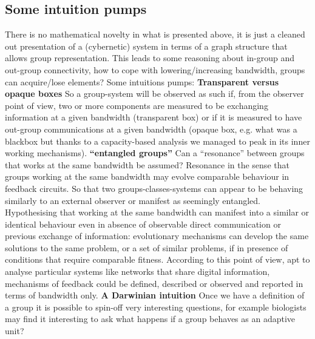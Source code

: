 \documentclass[14pt,a4paper]{extarticle}
\begin{document}
\subsection*{Some intuition pumps}
\label{subsec:cyb_pumps}
\hspace*{15mm}There is no mathematical novelty in what is presented above, it is just a cleaned out presentation of a (cybernetic) system in terms of a graph structure that allows group representation. This leads to some reasoning about in-group and out-group connectivity, how to cope with lowering/increasing bandwidth, groups can acquire/lose elements? Some intuitions pumps:
\newline
\hspace*{7.5mm}\textbf{Transparent versus opaque boxes}
\newline
So a group-system will be observed as such if, from the observer point of view, two or more components are measured to be exchanging information at a given bandwidth (transparent box) or if it is measured to have out-group communications at a given bandwidth (opaque box, e.g. what was a blackbox but thanks to a capacity-based analysis we managed to peak in its inner working mechanisms).
\newline
\hspace*{7.5mm}\textbf{“entangled groups”}
\newline
Can a “resonance” between groups that works at the same bandwidth be assumed? Resonance in the sense that groups working at the same bandwidth may evolve comparable behaviour in feedback circuits. So that two groups-classes-systems can appear to be behaving similarly to an external observer or manifest as seemingly entangled. Hypothesising that working at the same bandwidth can manifest into a similar or identical behaviour even in absence of observable direct communication or previous exchange of information: evolutionary mechanisms can develop the same solutions to the same problem, or a set of similar problems, if in presence of conditions that require comparable fitness. According to this point of view, apt to analyse particular systems like networks that share digital information, mechanisms of feedback could be defined, described or observed and reported in terms of bandwidth only.
\newline
\hspace*{7.5mm}\textbf{A Darwinian intuition}
\newline
Once we have a definition of a group it is possible to spin-off very interesting questions, for example biologists may find it interesting to ask what happens if a group behaves as an adaptive unit?
\end{document}
